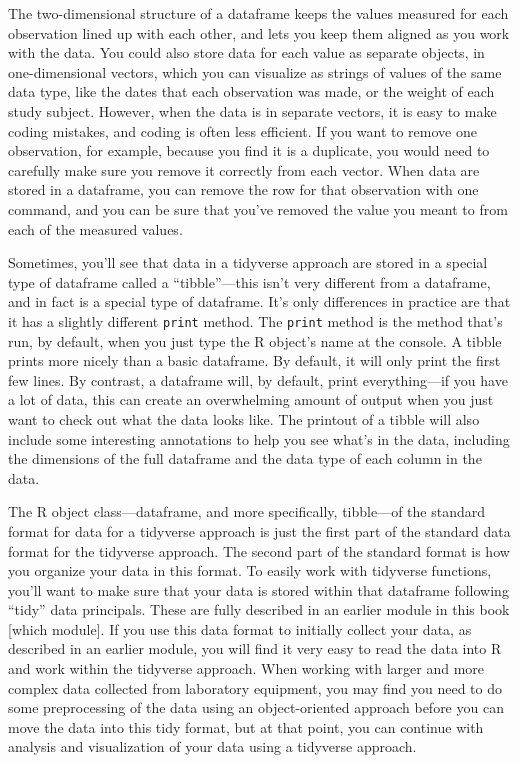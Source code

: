 \documentclass[]{tufte-book}
\begin{document}
The two-dimensional structure of a dataframe keeps the values
measured for each observation lined up with each other, and lets you keep them
aligned as you work with the data. You could also store data for each value as
separate objects, in one-dimensional vectors, which you can visualize as strings
of values of the same data type, like the dates that each observation was made,
or the weight of each study subject. However, when the data is in separate
vectors, it is easy to make coding mistakes, and coding is often less efficient.
If you want to remove one observation, for example, because you find it is a
duplicate, you would need to carefully make sure you remove it correctly from
each vector. When data are stored in a dataframe, you can remove the row for
that observation with one command, and you can be sure that you've removed the
value you meant to from each of the measured values.

Sometimes, you'll see that data in a tidyverse approach are stored in a special
type of dataframe called a ``tibble''---this isn't very different from a
dataframe, and in fact is a special type of dataframe. It's only differences in
practice are that it has a slightly different \texttt{print} method. The \texttt{print} method
is the method that's run, by default, when you just type the R object's name
at the console. A tibble prints more nicely than a basic dataframe. By default,
it will only print the first few lines. By contrast, a dataframe will, by default,
print everything---if you have a lot of data, this can create an overwhelming
amount of output when you just want to check out what the data looks like. The
printout of a tibble will also include some interesting annotations to help you
see what's in the data, including the dimensions of the full dataframe and the
data type of each column in the data.

The R object class---dataframe, and more specifically, tibble---of the standard
format for data for a tidyverse approach is just the first part of the standard
data format for the tidyverse approach. The second part of the standard format is
how you organize your data in this format. To easily work with tidyverse functions,
you'll want to make sure that your data is stored within that dataframe following
``tidy'' data principals. These are fully described in an earlier module in this
book {[}which module{]}. If you use this data format to initially collect your
data, as described in an earlier module, you will find it very easy to read the
data into R and work within the tidyverse approach. When working with larger and
more complex data collected from laboratory equipment, you may find you need to
do some preprocessing of the data using an object-oriented approach before you
can move the data into this tidy format, but at that point, you can continue with
analysis and visualization of your data using a tidyverse approach.
\end{document}
